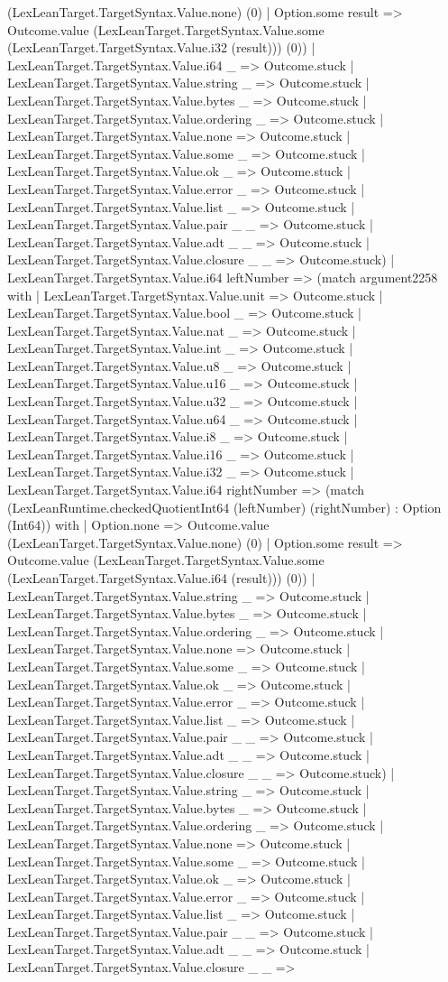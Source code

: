 \documentclass[11pt]{article}
\begin{document}
(LexLeanTarget.TargetSyntax.Value.none) (0) | Option.some result => Outcome.value (LexLeanTarget.TargetSyntax.Value.some (LexLeanTarget.TargetSyntax.Value.i32 (result))) (0)) | LexLeanTarget.TargetSyntax.Value.i64 \_ => Outcome.stuck | LexLeanTarget.TargetSyntax.Value.string \_ => Outcome.stuck | LexLeanTarget.TargetSyntax.Value.bytes \_ => Outcome.stuck | LexLeanTarget.TargetSyntax.Value.ordering \_ => Outcome.stuck | LexLeanTarget.TargetSyntax.Value.none => Outcome.stuck | LexLeanTarget.TargetSyntax.Value.some \_ => Outcome.stuck | LexLeanTarget.TargetSyntax.Value.ok \_ => Outcome.stuck | LexLeanTarget.TargetSyntax.Value.error \_ => Outcome.stuck | LexLeanTarget.TargetSyntax.Value.list \_ => Outcome.stuck | LexLeanTarget.TargetSyntax.Value.pair \_ \_ => Outcome.stuck | LexLeanTarget.TargetSyntax.Value.adt \_ \_ => Outcome.stuck | LexLeanTarget.TargetSyntax.Value.closure \_ \_ => Outcome.stuck) | LexLeanTarget.TargetSyntax.Value.i64 leftNumber => (match argument2258 with | LexLeanTarget.TargetSyntax.Value.unit => Outcome.stuck | LexLeanTarget.TargetSyntax.Value.bool \_ => Outcome.stuck | LexLeanTarget.TargetSyntax.Value.nat \_ => Outcome.stuck | LexLeanTarget.TargetSyntax.Value.int \_ => Outcome.stuck | LexLeanTarget.TargetSyntax.Value.u8 \_ => Outcome.stuck | LexLeanTarget.TargetSyntax.Value.u16 \_ => Outcome.stuck | LexLeanTarget.TargetSyntax.Value.u32 \_ => Outcome.stuck | LexLeanTarget.TargetSyntax.Value.u64 \_ => Outcome.stuck | LexLeanTarget.TargetSyntax.Value.i8 \_ => Outcome.stuck | LexLeanTarget.TargetSyntax.Value.i16 \_ => Outcome.stuck | LexLeanTarget.TargetSyntax.Value.i32 \_ => Outcome.stuck | LexLeanTarget.TargetSyntax.Value.i64 rightNumber => (match (LexLeanRuntime.checkedQuotientInt64 (leftNumber) (rightNumber) : Option (Int64)) with | Option.none => Outcome.value (LexLeanTarget.TargetSyntax.Value.none) (0) | Option.some result => Outcome.value (LexLeanTarget.TargetSyntax.Value.some (LexLeanTarget.TargetSyntax.Value.i64 (result))) (0)) | LexLeanTarget.TargetSyntax.Value.string \_ => Outcome.stuck | LexLeanTarget.TargetSyntax.Value.bytes \_ => Outcome.stuck | LexLeanTarget.TargetSyntax.Value.ordering \_ => Outcome.stuck | LexLeanTarget.TargetSyntax.Value.none => Outcome.stuck | LexLeanTarget.TargetSyntax.Value.some \_ => Outcome.stuck | LexLeanTarget.TargetSyntax.Value.ok \_ => Outcome.stuck | LexLeanTarget.TargetSyntax.Value.error \_ => Outcome.stuck | LexLeanTarget.TargetSyntax.Value.list \_ => Outcome.stuck | LexLeanTarget.TargetSyntax.Value.pair \_ \_ => Outcome.stuck | LexLeanTarget.TargetSyntax.Value.adt \_ \_ => Outcome.stuck | LexLeanTarget.TargetSyntax.Value.closure \_ \_ => Outcome.stuck) | LexLeanTarget.TargetSyntax.Value.string \_ => Outcome.stuck | LexLeanTarget.TargetSyntax.Value.bytes \_ => Outcome.stuck | LexLeanTarget.TargetSyntax.Value.ordering \_ => Outcome.stuck | LexLeanTarget.TargetSyntax.Value.none => Outcome.stuck | LexLeanTarget.TargetSyntax.Value.some \_ => Outcome.stuck | LexLeanTarget.TargetSyntax.Value.ok \_ => Outcome.stuck | LexLeanTarget.TargetSyntax.Value.error \_ => Outcome.stuck | LexLeanTarget.TargetSyntax.Value.list \_ => Outcome.stuck | LexLeanTarget.TargetSyntax.Value.pair \_ \_ => Outcome.stuck | LexLeanTarget.TargetSyntax.Value.adt \_ \_ => Outcome.stuck | LexLeanTarget.TargetSyntax.Value.closure \_ \_ => 
\end{document}
